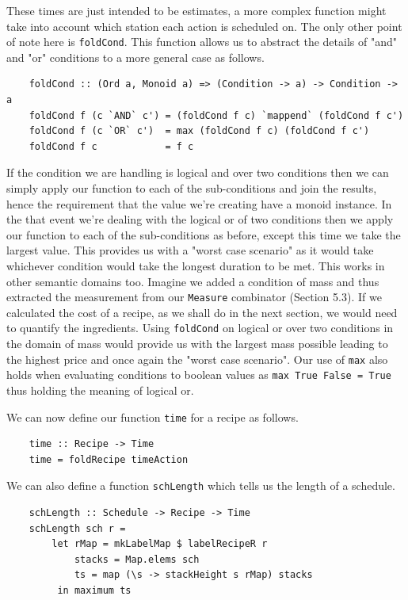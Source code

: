 \documentclass[11pt]{article}
\begin{document}
These times are just intended to be estimates, a more complex function might take into account which
station each action is scheduled on. The only other point of note here is \texttt{foldCond}.
This function allows us to abstract the details of "and" and "or" conditions to a more general
case as follows.

\begin{lstlisting}
    foldCond :: (Ord a, Monoid a) => (Condition -> a) -> Condition -> a
    foldCond f (c `AND` c') = (foldCond f c) `mappend` (foldCond f c')
    foldCond f (c `OR` c')  = max (foldCond f c) (foldCond f c')
    foldCond f c            = f c
\end{lstlisting}

If the condition we are handling is logical and over two conditions then we can simply apply our function
to each of the sub-conditions and join the results, hence the requirement that the value we're
creating have a monoid instance. In the that event we're dealing with the logical or of two conditions then
we apply our function to each of the sub-conditions as before, except this time we take the largest value.
This provides us with a "worst case scenario" as it would take whichever condition would take the longest
duration to be met. This works in other semantic domains too. Imagine we added a condition of mass and thus
extracted the measurement from our \texttt{Measure} combinator (Section 5.3). If we calculated the cost of a recipe, as we shall
do in the next section, we would need to quantify the ingredients. Using \texttt{foldCond} on logical or over two
conditions in the domain of mass would provide us with the largest mass possible leading to the highest price and
once again the "worst case scenario". Our use of \texttt{max} also holds when evaluating conditions to boolean values
as \texttt{max True False = True} thus holding the meaning of logical or.

\medbreak

We can now define our function \texttt{time} for a recipe as follows.

\begin{lstlisting}
    time :: Recipe -> Time
    time = foldRecipe timeAction
\end{lstlisting}

We can also define a function \texttt{schLength} which tells us the length of a schedule.

\begin{lstlisting}
    schLength :: Schedule -> Recipe -> Time
    schLength sch r =
        let rMap = mkLabelMap $ labelRecipeR r
            stacks = Map.elems sch
            ts = map (\s -> stackHeight s rMap) stacks
         in maximum ts
\end{lstlisting}
\end{document}
